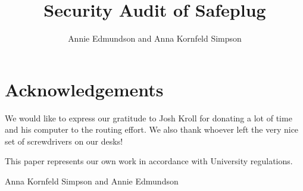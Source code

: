 \documentclass[12pt, letterpaper]{article}
\title{Security Audit of Safeplug}
\author{Annie Edmundson and Anna Kornfeld Simpson}
\begin{document}
\maketitle









\section{Acknowledgements}
We would like to express our gratitude to Josh Kroll for donating a lot of time and his computer to the routing effort.  We also thank whoever left the very nice set of screwdrivers on our desks!

This paper represents our own work in accordance with University regulations.

Anna Kornfeld Simpson and Annie Edmundson


\end{document}

